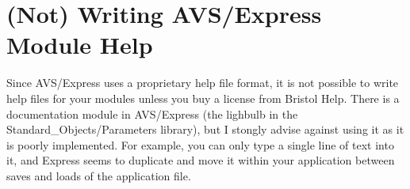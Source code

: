 \section{(Not) Writing AVS/Express Module Help}
\label{(Not) Writing AVS/Express Module Help}

Since AVS/Express uses a proprietary help file format, it is not possible to
write help files for your modules unless you buy a license from
Bristol Help.  There is a documentation module in AVS/Express (the lighbulb
in the Standard\_Objects/Parameters library), but I stongly advise against
using it as it is poorly implemented.  For example, you can only type a
single line of text into it, and Express seems to duplicate and move it
within your application between saves and loads of the application file.
